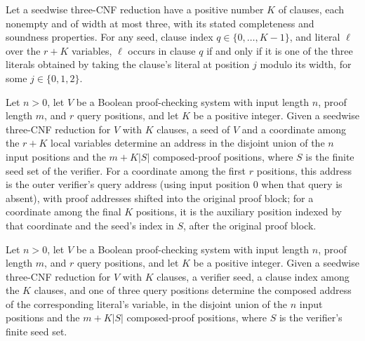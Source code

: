 \begin{theorem}
\label{FABL.SeedwiseThreeCNFReduction.mem_clause_iff_exists_literal}
\leanok
{}
Let a seedwise three-CNF reduction have a positive number $K$ of clauses, each nonempty
and of width at most three, with its stated completeness and soundness properties. For
any seed, clause index $q\in\{0,\ldots,K-1\}$, and literal $\ell$ over the $r+K$
variables, $\ell$ occurs in clause $q$ if and only if it is one of the three literals
obtained by taking the clause’s literal at position $j$ modulo its width, for some
$j\in\{0,1,2\}$.
\end{theorem}

\begin{definition}
\label{FABL.compositionAddress}
\leanok
{}
Let $n>0$, let $V$ be a Boolean proof-checking system with input length $n$, proof
length $m$, and $r$ query positions, and let $K$ be a positive integer. Given a seedwise
three-CNF reduction for $V$ with $K$ clauses, a seed of $V$ and a coordinate among the
$r+K$ local variables determine an address in the disjoint union of the $n$ input
positions and the $m+K|S|$ composed-proof positions, where $S$ is the finite seed set of
the verifier. For a coordinate among the first $r$ positions, this address is the outer
verifier’s query address (using input position $0$ when that query is absent), with
proof addresses shifted into the original proof block; for a coordinate among the final
$K$ positions, it is the auxiliary position indexed by that coordinate and the seed’s
index in $S$, after the original proof block.
\end{definition}

\begin{definition}
\label{FABL.compositionLiteralAddress}
\leanok
{}
Let $n>0$, let $V$ be a Boolean proof-checking system with input length $n$, proof
length $m$, and $r$ query positions, and let $K$ be a positive integer. Given a seedwise
three-CNF reduction for $V$ with $K$ clauses, a verifier seed, a clause index among the
$K$ clauses, and one of three query positions determine the composed address of the
corresponding literal’s variable, in the disjoint union of the $n$ input positions and
the $m+K|S|$ composed-proof positions, where $S$ is the verifier’s finite seed set.
\end{definition}

